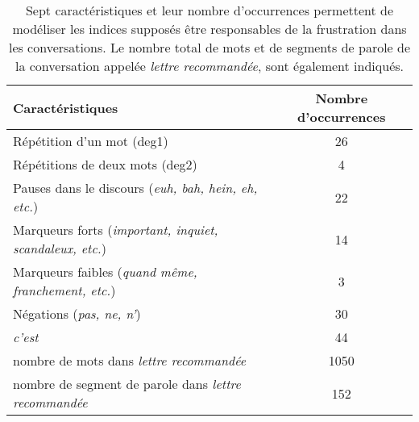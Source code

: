\begin{table}[]
    \centering
    \begin{tabular}{|l|c|}
      \hline
    \textbf{Caractéristiques} & \textbf{Nombre d'occurrences} \\\hline
    Répétition d'un mot (deg1)     & 26 \\
    Répétitions de deux mots (deg2) & 4\\
    Pauses dans le discours (\textit{euh, bah, hein, eh, etc.}) & 22\\
    Marqueurs forts (\textit{important, inquiet, scandaleux, etc.}) & 14\\
    Marqueurs faibles (\textit{quand même, franchement, etc.}) & 3\\
    Négations (\textit{pas, ne, n'}) & 30\\
    \textit{c'est} & 44\\ \hline
    nombre de mots dans \textit{lettre recommandée} & 1050 \\
    nombre de segment de parole dans \textit{lettre recommandée} & 152 \\ \hline
    \end{tabular}
    \caption{Sept caractéristiques et leur nombre d'occurrences permettent de modéliser les indices supposés être responsables de la frustration dans les conversations. Le nombre total de mots et de segments de parole de la conversation appelée \textit{lettre recommandée}, sont également indiqués.}
    \label{tab:ex_features}
\end{table}
